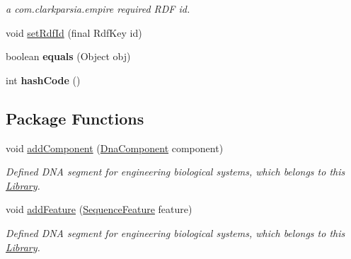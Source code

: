 \begin{DoxyCompactItemize}
\begin{DoxyCompactList}\small\item\em a com.clarkparsia.empire required RDF id. \item\end{DoxyCompactList}\item 
void \hyperlink{classorg_1_1sbolstandard_1_1lib_s_b_o_lj_1_1_library_a976b7f61221586e9ee73f6fc331bf3ea}{setRdfId} (final RdfKey id)
\item 
\hypertarget{classorg_1_1sbolstandard_1_1lib_s_b_o_lj_1_1_library_acd76902489e9ba6c1e6862ec1619f450}{
boolean {\bfseries equals} (Object obj)}
\label{classorg_1_1sbolstandard_1_1lib_s_b_o_lj_1_1_library_acd76902489e9ba6c1e6862ec1619f450}

\item 
\hypertarget{classorg_1_1sbolstandard_1_1lib_s_b_o_lj_1_1_library_a7204b7246e94a26588fd68da3b728121}{
int {\bfseries hashCode} ()}
\label{classorg_1_1sbolstandard_1_1lib_s_b_o_lj_1_1_library_a7204b7246e94a26588fd68da3b728121}

\end{DoxyCompactItemize}
\subsection*{Package Functions}
\begin{DoxyCompactItemize}
\item 
void \hyperlink{classorg_1_1sbolstandard_1_1lib_s_b_o_lj_1_1_library_aad38ada3f43e55f64bade0a0f0af46b2}{addComponent} (\hyperlink{classorg_1_1sbolstandard_1_1lib_s_b_o_lj_1_1_dna_component}{DnaComponent} component)
\begin{DoxyCompactList}\small\item\em Defined DNA segment for engineering biological systems, which belongs to this \hyperlink{classorg_1_1sbolstandard_1_1lib_s_b_o_lj_1_1_library}{Library}. \item\end{DoxyCompactList}\item 
void \hyperlink{classorg_1_1sbolstandard_1_1lib_s_b_o_lj_1_1_library_a4fe0e7845bfea40035fae805e56bbc8d}{addFeature} (\hyperlink{classorg_1_1sbolstandard_1_1lib_s_b_o_lj_1_1_sequence_feature}{SequenceFeature} feature)
\begin{DoxyCompactList}\small\item\em Defined DNA segment for engineering biological systems, which belongs to this \hyperlink{classorg_1_1sbolstandard_1_1lib_s_b_o_lj_1_1_library}{Library}. \item\end{DoxyCompactList}\end{DoxyCompactItemize}


